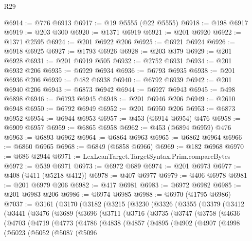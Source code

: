 \begin{lexlean}{R29}
\begin{coremodule}
@6914 := @776 @6913
@6917 := @19 @5555 (@22 @5555)
@6918 := @198 @6917
@6919 := @203 @300
@6920 := @1371 @6919
@6921 := @201 @6920
@6922 := @1371 @2595
@6924 := @201 @6922 @206
@6925 := @6921 @6924
@6926 := @6918 @6925
@6927 := @1793 @6926
@6928 := @203 @379
@6929 := @201 @6928
@6931 := @201 @6919 @505
@6932 := @2752 @6931
@6934 := @201 @6932 @206
@6935 := @6929 @6934
@6936 := @6793 @6935
@6938 := @201 @6936 @206
@6939 := @482 @6938
@6940 := @6792 @6939
@6942 := @201 @6940 @206
@6943 := @6873 @6942
@6944 := @6927 @6943
@6945 := @498 @6898
@6946 := @6793 @6945
@6948 := @201 @6946 @206
@6949 := @2610 @6948
@6950 := @6792 @6949
@6952 := @201 @6950 @206
@6953 := @6873 @6952
@6954 := @6944 @6953
@6957 := @453 (@6914 @6954) @476
@6958 := @6909 @6957
@6959 := @6865 @6958
@6962 := @453 (@6894 @6959) @476
@6963 := @6893 @6962
@6964 := @6864 @6963
@6965 := @6862 @6964
@6966 := @6860 @6965
@6968 := @6849 (@6858 @6966)
@6969 := @182 @6968
@6970 := @686 @2944
@6971 := LexLeanTarget.TargetSyntax.Prim.compareBytes
@6972 := @539 @6971
@6973 := @6972 @689
@6974 := @201 @6973
@6977 := @408 (@411 (@5218 @412))
@6978 := @407 @6977
@6979 := @406 @6978
@6981 := @201 @6979 @206
@6982 := @417 @6981
@6983 := @6972 @6982
@6985 := @201 @6983 @206
@6986 := @6974 @6985
@6988 := @6970 (@1795 @6986)
@7037 := @3161
    (@3170
      (@3182
        (@3215
          (@3230
            (@3326
              (@3355
                (@3379
                  (@3412
                    (@3441
                      (@3476
                        (@3689
                          (@3696
                            (@3711
                              (@3716
                                (@3735
                                  (@3747
                                    (@3758
                                      (@4636
                                        (@4703
                                          (@4719
                                            (@4773
                                              (@4786
                                                (@4838
                                                  (@4857
                                                    (@4895
                                                      (@4902
                                                        (@4907
                                                          (@4998
                                                            (@5023
                                                              (@5052
                                                                (@5087
                                                                  (@5096

\end{coremodule}
\end{lexlean}
